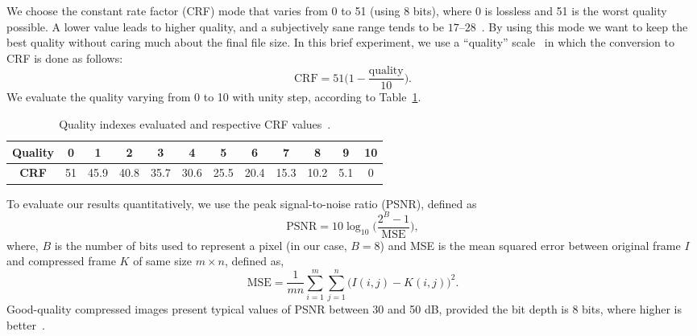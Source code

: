   We choose the constant rate factor (CRF)
  mode that varies from 0 to 51 (using 8 bits), where 0 is lossless and 51 is the worst quality possible.
  A lower value leads to higher quality, and a subjectively sane range tends to be $17$--$28$~\cite{web:ffmpeg}.
  By using this mode we want to keep the best quality without caring much about the final file size.
  In this brief experiment, we use a “quality” scale~\cite{imageio} in which the conversion to CRF is done as follows:
  \begin{equation}
     \textrm{CRF} = 51\bigg(1 - \frac{\textrm{quality}}{10}\bigg).
    \end{equation}
  We evaluate the quality varying from 0 to 10 with unity step, according to Table~\ref{tab:crfxqual}.
%
\begin{table}[htb!]
\caption{Quality indexes evaluated and respective CRF values~\cite{web:ffmpeg}.}
\label{tab:crfxqual}
\centering
\begin{tabular}{@{}cccccccccccc@{}}
\toprule
\textbf{Quality} & 0  & 1    & 2    & 3    & 4    & 5    & 6    & 7    & 8    & 9   & 10 \\ \midrule
\textbf{CRF}     & 51 & 45.9 & 40.8 & 35.7 & 30.6 & 25.5 & 20.4 & 15.3 & 10.2 & 5.1 & 0  \\ \bottomrule
\end{tabular}
\end{table}

To evaluate our results quantitatively, we use the peak signal-to-noise ratio (PSNR), defined as
%
\begin{equation}
    \textrm{PSNR} = 10\log_{10}\bigg({\frac{2^B-1}{\textrm{MSE}}}\bigg),
    \label{eq:psnr}
\end{equation}
%
where, $B$ is the number of bits used to represent a pixel (in our case, $B=8$) and MSE is the mean squared error between original frame $I$ and compressed frame $K$ of same size $m\times n$, defined as,
%
\begin{equation}
    \textrm{MSE} = \frac{1}{mn} \sum_{i=1}^{m}\sum_{j=1}^{n} \bigg(I(i,j) - K(i,j) \bigg)^2.
    \label{eq:mse}
\end{equation}
%
%
Good-quality compressed images present typical values of PSNR between 30 and 50 dB, provided the bit depth is 8 bits, where higher is better~\cite{Welstead20019compression}.

